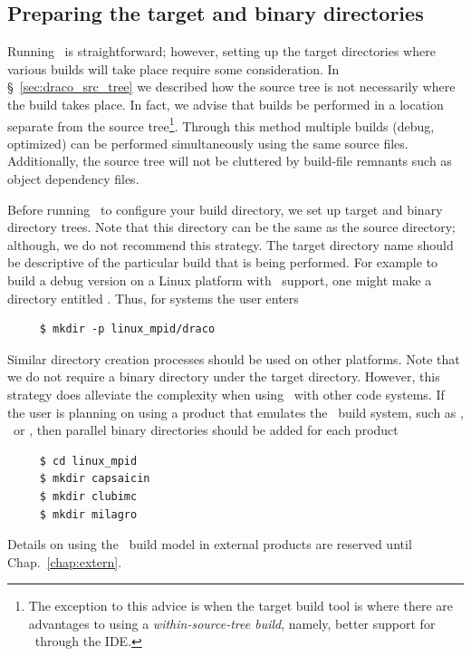 \subsection{Preparing the target and binary directories}
\label{sec:running_configure_prepare}

Running \cmake\ is straightforward; however, setting up the target
directories where various builds will take place require some
consideration.  In \S~\ref{sec:draco_src_tree} we described how the
source tree is not necessarily where the build takes place.  In fact,
we advise that builds be performed in a location separate from the
source tree\footnote{The exception to this advice is when the target build tool is  where there are advantages to using a {\it within-source-tree build}, namely, better support for \svn\ through the  IDE.}.  Through this method multiple builds (debug, optimized) can be performed
simultaneously using the same source files.  Additionally, the source tree will not be cluttered
by build-file remnants such as object dependency files.

Before running \cmake\ to configure your build directory, we set up target and binary directory trees.  Note
that this directory can be the same as the source directory; although,
we do not recommend this strategy.  The target directory name should
be descriptive of the particular build that is being performed.  For
example to build a debug version on a Linux platform with \mpi\ support, one might make
a directory entitled . Thus, for  systems the user enters
\begin{verbatim}
     $ mkdir -p linux_mpid/draco
\end{verbatim} %
Similar directory creation processes should be used on other platforms.  Note that we do not require a  binary directory under the target
directory.  However, this strategy does alleviate the complexity when
using \draco\ with other code systems.  If the user is planning on
using a product that emulates the \draco\ build system, such as
\capsaicin, \clubimc\  or \milagro, then parallel binary directories should be
added for each product
\begin{verbatim}
     $ cd linux_mpid
     $ mkdir capsaicin
     $ mkdir clubimc
     $ mkdir milagro
\end{verbatim}
Details on using the \draco\ build model in external products are
reserved until Chap.~\ref{chap:extern}.

